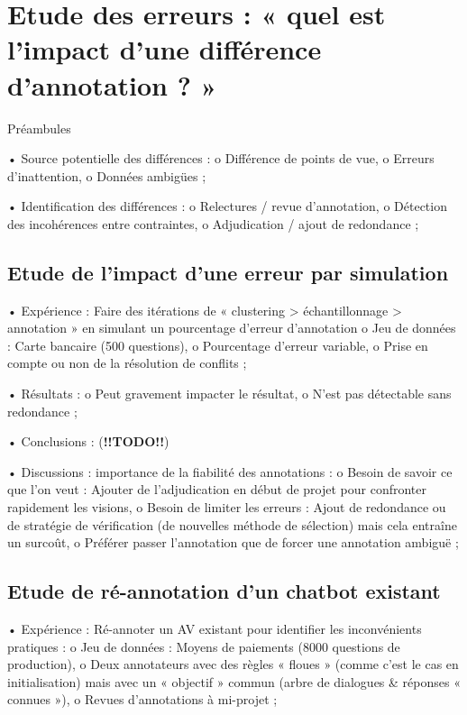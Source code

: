     \section{Etude des erreurs : « quel est l’impact d’une différence d’annotation ? »}

        Préambules

        •	Source potentielle des différences :
            o	Différence de points de vue,
            o	Erreurs d’inattention,
            o	Données ambigües ;

        •	Identification des différences :
            o	Relectures / revue d’annotation,
            o	Détection des incohérences entre contraintes,
            o	Adjudication / ajout de redondance ;


        \subsection{Etude de l’impact d’une erreur par simulation}

        •	Expérience : Faire des itérations de « clustering > échantillonnage > annotation » en simulant un pourcentage d’erreur d’annotation
            o	Jeu de données : Carte bancaire (500 questions),
            o	Pourcentage d’erreur variable,
            o	Prise en compte ou non de la résolution de conflits ;

        •	Résultats : 
            o	Peut gravement impacter le résultat,
            o	N’est pas détectable sans redondance ;

        •	Conclusions :  (\textbf{!!TODO!!})

        •	Discussions : importance de la fiabilité des annotations :
            o	Besoin de savoir ce que l’on veut : Ajouter de l’adjudication en début de projet pour confronter rapidement les visions,
            o	Besoin de limiter les erreurs : Ajout de redondance ou de stratégie de vérification (de nouvelles méthode de sélection) mais cela entraîne un surcoût,
            o	Préférer passer l’annotation que de forcer une annotation ambiguë ;


        \subsection{Etude de ré-annotation d’un chatbot existant}

        •	Expérience : Ré-annoter un AV existant pour identifier les inconvénients pratiques :
            o	Jeu de données : Moyens de paiements (8000 questions de production),
            o	Deux annotateurs avec des règles « floues » (comme c’est le cas en initialisation) mais avec un « objectif » commun (arbre de dialogues \& réponses « connues »),
            o	Revues d’annotations à mi-projet ;

